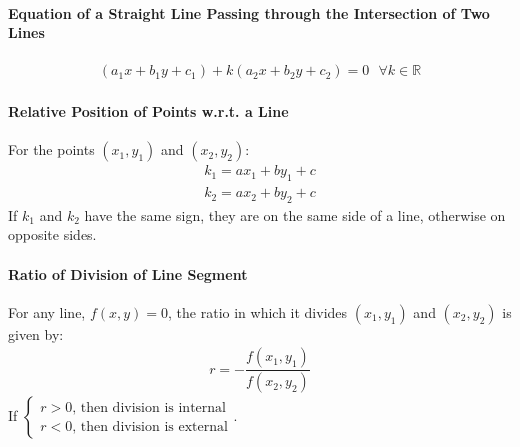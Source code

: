 \documentclass[../main.tex]{subfile}
\begin{document}
	\paragraph{Equation of a Straight Line Passing through the Intersection of Two Lines\newline}
	\begin{align}
		(a_1x+b_1y+c_1)+k(a_2x+b_2y+c_2)=0\text{ }\forall k\in\mathbb{R}
	\end{align}
	
	\paragraph{Relative Position of Points w.r.t. a Line}
	For the points $(x_1,y_1)$ and $(x_2,y_2)$:
	\begin{align}
		k_1=ax_1+by_1+c\nonumber\\
		k_2=ax_2+by_2+c\nonumber
	\end{align}
	If $k_1$ and $k_2$ have the same sign, they are on the same side of a line, otherwise on opposite sides.
	
	\paragraph{Ratio of Division of Line Segment}
	For any line, $f(x,y)=0$, the ratio in which it divides $(x_1,y_1)$ and $(x_2,y_2)$ is given by:
	\begin{align}
		r=-\dfrac{f(x_1,y_1)}{f(x_2,y_2)}
	\end{align}
	If $\begin{cases}r>0\text{, then division is internal}\\r<0\text{, then division is external}\end{cases}$.
\end{document}
